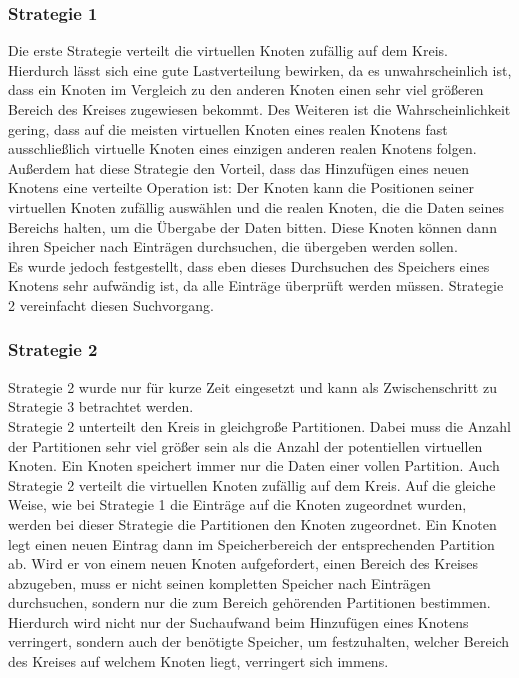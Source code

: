 \subsubsection*{Strategie 1}
Die erste Strategie verteilt die virtuellen Knoten zufällig auf dem Kreis. Hierdurch lässt sich eine gute Lastverteilung bewirken, da es unwahrscheinlich ist, dass ein Knoten im Vergleich zu den anderen Knoten einen sehr viel größeren Bereich des Kreises zugewiesen bekommt. Des Weiteren ist die Wahrscheinlichkeit gering, dass auf die meisten virtuellen Knoten eines realen Knotens fast ausschließlich virtuelle Knoten eines einzigen anderen realen Knotens folgen.\\
Außerdem hat diese Strategie den Vorteil, dass das Hinzufügen eines neuen Knotens eine verteilte Operation ist: Der Knoten kann die Positionen seiner virtuellen Knoten zufällig auswählen und die realen Knoten, die die Daten seines Bereichs halten, um die Übergabe der Daten bitten. Diese Knoten können dann ihren Speicher nach Einträgen durchsuchen, die übergeben werden sollen.\\
Es wurde jedoch festgestellt, dass eben dieses Durchsuchen des Speichers eines Knotens sehr aufwändig ist, da alle Einträge überprüft werden müssen. Strategie 2 vereinfacht diesen Suchvorgang. 
\subsubsection*{Strategie 2}
Strategie 2 wurde nur für kurze Zeit eingesetzt und kann als Zwischenschritt zu Strategie 3 betrachtet werden.\\
Strategie 2 unterteilt den Kreis in gleichgroße Partitionen. Dabei muss die Anzahl der Partitionen sehr viel größer sein als die Anzahl der potentiellen virtuellen Knoten. Ein Knoten speichert immer nur die Daten einer vollen Partition. Auch Strategie 2 verteilt die virtuellen Knoten zufällig auf dem Kreis. Auf die gleiche Weise, wie bei Strategie 1 die Einträge auf die Knoten zugeordnet wurden, werden bei dieser Strategie die Partitionen den Knoten zugeordnet. Ein Knoten legt einen neuen Eintrag dann im Speicherbereich der entsprechenden Partition ab. Wird er von einem neuen Knoten aufgefordert, einen Bereich des Kreises abzugeben, muss er nicht seinen kompletten Speicher nach Einträgen durchsuchen, sondern nur die zum Bereich gehörenden Partitionen bestimmen. Hierdurch wird nicht nur der Suchaufwand beim Hinzufügen eines Knotens verringert, sondern auch der benötigte Speicher, um festzuhalten, welcher Bereich des Kreises auf welchem Knoten liegt, verringert sich immens.
